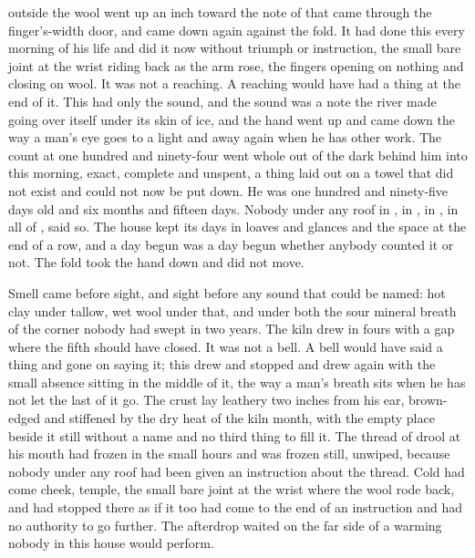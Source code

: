 
 outside the wool went up an inch toward the note of  that came through the finger's-width door, and came down again against the fold. It had done this every morning of his life and did it now without triumph or instruction, the small bare joint at the wrist riding back as the arm rose, the fingers opening on nothing and closing on wool. It was not a reaching. A reaching would have had a thing at the end of it. This had only the sound, and the sound was a note the river made going over itself under its skin of ice, and the hand went up and came down the way a man's eye goes to a light and away again when he has other work. The count at one hundred and ninety-four went whole out of the dark behind him into this morning, exact, complete and unspent, a thing laid out on a towel that did not exist and could not now be put down. He was one hundred and ninety-five days old and six months and fifteen days. Nobody under any roof in , in , in , in all of , said so. The house kept its days in loaves and glances and the space at the end of a row, and a day begun was a day begun whether anybody counted it or not. The fold took the hand down and did not move.

Smell came before sight, and sight before any sound that could be named: hot clay under tallow, wet wool under that, and under both the sour mineral breath of the corner nobody had swept in two years. The kiln drew in fours with a gap where the fifth should have closed. It was not a bell. A bell would have said a thing and gone on saying it; this drew and stopped and drew again with the small absence sitting in the middle of it, the way a man's breath sits when he has not let the last of it go. The crust lay leathery two inches from his ear, brown-edged and stiffened by the dry heat of the kiln month, with the empty place beside it still without a name and no third thing to fill it. The thread of drool at his mouth had frozen in the small hours and was frozen still, unwiped, because nobody under any roof had been given an instruction about the thread. Cold had come cheek, temple, the small bare joint at the wrist where the wool rode back, and had stopped there as if it too had come to the end of an instruction and had no authority to go further. The afterdrop waited on the far side of a warming nobody in this house would perform.

